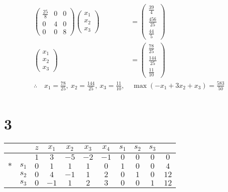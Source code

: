 \documentclass[a4paper,12pt]{article}
\begin{document}
\begin{align*}
    \begin{pmatrix}\frac{25}{8} & 0 & 0 \\ 0 & 4 & 0 \\ 0 & 0 & 8\end{pmatrix} \begin{pmatrix}x_1 \\ x_2 \\ x_3\end{pmatrix} & = \begin{pmatrix}\frac{39}{4} \\ \frac{456}{25} \\ \frac{44}{5}\end{pmatrix}   \\
    \begin{pmatrix}x_1 \\ x_2 \\ x_3\end{pmatrix}                                                                            & = \begin{pmatrix}\frac{78}{25} \\ \frac{144}{25} \\ \frac{11}{10}\end{pmatrix} \\
    \therefore \quad x_1 = \frac{78}{25}, \ x_2 = \frac{144}{25}, \ x_3 = \frac{11}{10},                                     & \ \max{(-x_1 + 3 x_2 + x_3)} = \frac{583}{50}                                  \\
\end{align*}

\section*{3}
\begin{table}[H]
    \tiny
    \begin{tabularx}{\textwidth}{cc|cccccccc|c}
            &       & $z$ & $x_1$ & $x_2$ & $x_3$ & $x_4$ & $s_1$ & $s_2$ & $s_3$        \\
        \hline
            &       & $1$ & $3$   & $-5$  & $-2$  & $-1$  & $0$   & $0$   & $0$   & $0$  \\
        \hline
        $*$ & $s_1$ & $0$ & $1$   & $1$   & $1$   & $0$   & $1$   & $0$   & $0$   & $4$  \\
            & $s_2$ & $0$ & $4$   & $-1$  & $1$   & $2$   & $0$   & $1$   & $0$   & $12$ \\
            & $s_3$ & $0$ & $-1$  & $1$   & $2$   & $3$   & $0$   & $0$   & $1$   & $12$ \\
    \end{tabularx}
\end{table}
\end{document}
